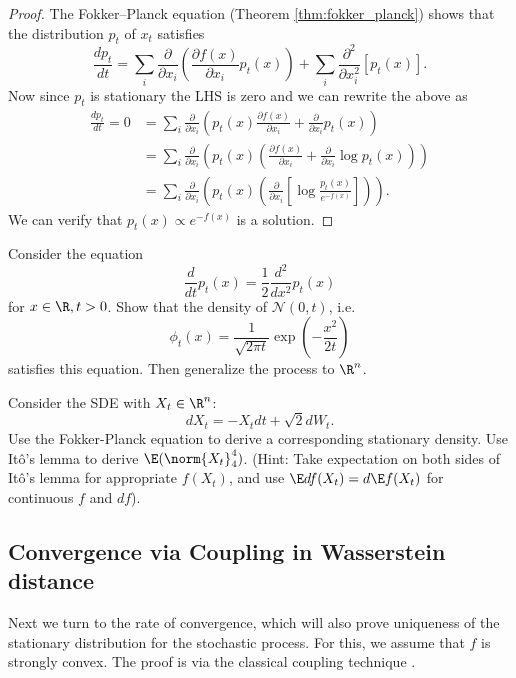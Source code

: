\begin{proof}
The Fokker--Planck equation (Theorem \ref{thm:fokker_planck}) shows
that the distribution $p_{t}$ of $x_{t}$ satisfies 
\begin{equation}
\frac{dp_{t}}{dt}=\sum_{i}\frac{\partial}{\partial x_{i}}(\frac{\partial f(x)}{\partial x_{i}}p_{t}(x))+\sum_{i}\frac{\partial^{2}}{\partial x_{i}^{2}}\left[p_{t}(x)\right].\label{eq:dp_LD}
\end{equation}
Now since $p_{t}$ is stationary the LHS is zero and we can rewrite
the above as
\begin{align*}
\frac{dp_{t}}{dt}=0 & =\sum_{i}\frac{\partial}{\partial x_{i}}\left(p_{t}(x)\frac{\partial f(x)}{\partial x_{i}}+\frac{\partial}{\partial x_{i}}p_{t}(x)\right)\\
 & =\sum_{i}\frac{\partial}{\partial x_{i}}\left(p_{t}(x)\left(\frac{\partial f(x)}{\partial x_{i}}+\frac{\partial}{\partial x_{i}}\log p_{t}(x)\right)\right)\\
 & =\sum_{i}\frac{\partial}{\partial x_{i}}\left(p_{t}(x)\left(\frac{\partial}{\partial x_{i}}\left[\log\frac{p_{t}(x)}{e^{-f(x)}}\right]\right)\right).
\end{align*}
We can verify that $p_{t}(x)\propto e^{-f(x)}$ is a solution.
\end{proof}
\begin{xca}
Consider the equation 
\[
\frac{d}{dt}p_{t}(x)=\frac{1}{2}\frac{d^{2}}{dx^{2}}p_{t}(x)
\]
 for $x\in\R,t>0$. Show that the density of $\mathcal{N}(0,t)$,
i.e. 
\[
\phi_{t}(x)=\frac{1}{\sqrt{2\pi t}}\exp\left(-\frac{x^{2}}{2t}\right)
\]
 satisfies this equation. Then generalize the process to $\R^{n}$.
\end{xca}

\begin{xca}
Consider the SDE with $X_{t}\in\R^{n}$: 
\[
dX_{t}=-X_{t}dt+\sqrt{2}dW_{t}.
\]
Use the Fokker-Planck equation to derive a corresponding stationary
density. Use It\^{o}'s lemma to derive $\E(\norm{X_{t}}_{4}^{4})$.
(Hint: Take expectation on both sides of It\^{o}'s lemma for appropriate
$f(X_{t})$, and use $\E df(X_{t})=d\E f(X_{t})$ for continuous $f$
and $df$). 
\end{xca}


\subsection{Convergence via Coupling in Wasserstein distance}

Next we turn to the rate of convergence, which will also prove uniqueness
of the stationary distribution for the stochastic process. For this,
we assume that $f$ is strongly convex. The proof is via the classical
coupling technique \cite{aldous1995reversible}. 

